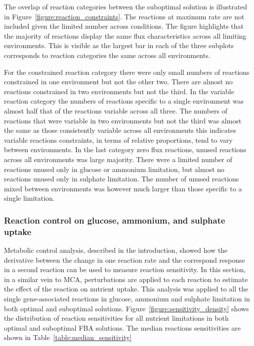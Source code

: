 The overlap of reaction categories between the suboptimal solution is illustrated in Figure~\vref{figure:reaction_constraints}. The reactions at maximum rate are not included given the limited number across conditions. The figure highlights that the majority of reactions display the same flux characteristics across all limiting environments. This is visible as the largest bar in each of the three subplots corresponds to reaction categories the same across all environments.

For the constrained reaction category there were only small numbers of reactions constrained in one environment but not the other two. There are almost no reactions constrained in two environments but not the third. In the variable reaction category the numbers of reactions specific to a single environment was almost half that of the reactions variable across all three. The numbers of reactions that were variable in two environments but not the third was almost the same as those consistently variable across all environments this indicates variable reactions constraints, in terms of relative proportions, tend to vary between environments. In the last category zero flux reactions, unused reactions across all environments was large majority. There were a limited number of reactions unused only in glucose or ammonium limitation, but almost no reactions unused only in sulphate limitation. The number of unused reactions mixed between environments was however much larger than those specific to a single limitation.

\subsubsection{Reaction control on glucose, ammonium, and sulphate uptake}%

Metabolic control analysis, described in the introduction, showed how the derivative between the change in one reaction rate and the correspond response in a second reaction can be used to measure reaction sensitivity. In this section, in a similar vein to MCA, perturbations are applied to each reaction to estimate the effect of the reaction on nutrient uptake. This analysis was applied to all the single gene-associated reactions in glucose, ammonium and sulphate limitation in both optimal and suboptimal solutions. Figure~\vref{figure:sensitivity_density} shows the distribution of reaction sensitivities for all nutrient limitations in both optimal and suboptimal FBA solutions. The median reactions sensitivities are shown in Table~\vref{table:median_sensitivity}

